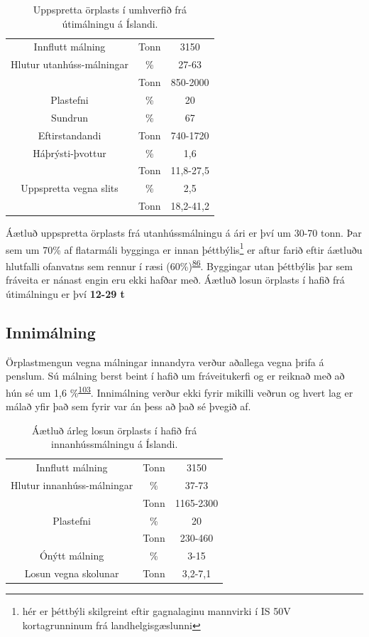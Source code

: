 \documentclass[icelandic,]{book}
\let\rmarkdownfootnote\footnote%
\def\footnote{\protect\rmarkdownfootnote}
\begin{document}
\begin{table}[t]

\caption{\label{tab:malningartafla}Uppspretta örplasts í umhverfið frá útimálningu á Íslandi.}
\centering
\begin{tabular}{ccc}
\toprule
Innflutt málning & Tonn & 3150\\
Hlutur utanhúss-málningar & \% & 27-63\\
 & Tonn & 850-2000\\
Plastefni & \% & 20\\
Sundrun & \% & 67\\
\addlinespace
Eftirstandandi & Tonn & 740-1720\\
Háþrýsti-þvottur & \% & 1,6\\
 & Tonn & 11,8-27,5\\
Uppspretta vegna slits & \% & 2,5\\
 & Tonn & 18,2-41,2\\
\bottomrule
\end{tabular}
\end{table}

Áætluð uppspretta örplasts frá utanhússmálningu á ári er því um 30-70 tonn. Þar sem um 70\% af flatarmáli bygginga er innan þéttbýlis\footnote{hér er þéttbýli skilgreint eftir gagnalaginu mannvirki í IS 50V kortagrunninum frá landhelgisgæslunni} er aftur farið eftir áætluðu hlutfalli ofanvatns sem rennur í ræsi (60\%)\textsuperscript{\protect\hyperlink{ref-Verschoor2016}{86}}. Byggingar utan þéttbýlis þar sem fráveita er nánast engin eru ekki hafðar með. Áætluð losun örplasts í hafið frá útimálningu er því \textbf{12-29 t}

\hypertarget{innimalning}{%
\subsection*{Innimálning}\label{innimalning}}

Örplastmengun vegna málningar innandyra verður aðallega vegna þrifa á penslum. Sú málning berst beint í hafið um fráveitukerfi og er reiknað með að hún sé um 1,6 \%\textsuperscript{\protect\hyperlink{ref-Hann2018}{103}}. Innimálning verður ekki fyrir mikilli veðrun og hvert lag er málað yfir það sem fyrir var án þess að það sé þvegið af.

\begin{table}[t]

\caption{\label{tab:innimalningartafla}Áætluð árleg losun örplasts í hafið frá innanhússmálningu á Íslandi.}
\centering
\begin{tabular}{ccc}
\toprule
Innflutt málning & Tonn & 3150\\
Hlutur innanhúss-málningar & \% & 37-73\\
 & Tonn & 1165-2300\\
Plastefni & \% & 20\\
 & Tonn & 230-460\\
\addlinespace
Ónýtt málning & \% & 3-15\\
Losun vegna skolunar & Tonn & 3,2-7,1\\
\bottomrule
\end{tabular}
\end{table}
\end{document}
